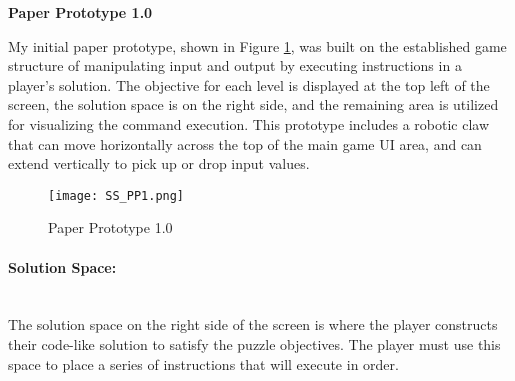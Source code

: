 \textbf{Paper Prototype 1.0}

My initial paper prototype, shown in Figure \ref{fig:Paper_Prototype_1.0}, was built 
on the established game structure of manipulating input and output by executing 
instructions in a player's solution. The objective for each level is displayed at the top 
left of the screen, the solution space is on the right side, and the remaining area is 
utilized for visualizing the command execution. This prototype includes a robotic 
claw that can move horizontally across the top of the main game UI area, and can 
extend vertically to pick up or drop input values.\\

\begin{figure}[!hb]
	\caption{Paper Prototype 1.0}
	\label{fig:Paper_Prototype_1.0}
	\centering
	\texttt{[image: SS\_PP1.png]}
\end{figure}

\paragraph{Solution Space:} ~\\
The solution space on the right side of the screen is where the player constructs their 
code-like solution to satisfy the puzzle objectives. The player must use this space to 
place a series of instructions that will execute in order.\\

